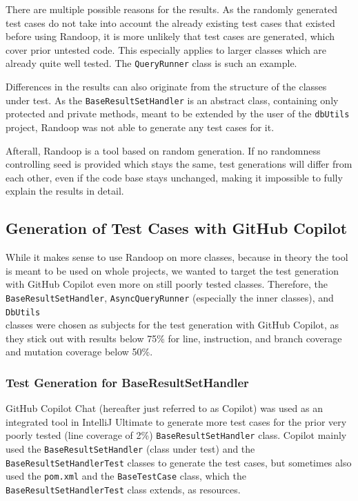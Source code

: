 \documentclass[sigconf]{acmart}
\begin{document}
There are multiple possible reasons for the results. As the randomly generated test cases do not take into account the already existing test cases that existed before using Randoop, it is more unlikely that test cases are generated, which cover prior untested code. This especially applies to larger classes which are already quite well tested. The \texttt{QueryRunner} class is such an example.

Differences in the results can also originate from the structure of the classes under test. As the \texttt{BaseResultSetHandler} is an abstract class, containing only protected and private methods, meant to be extended by the user of the \texttt{dbUtils} project, Randoop was not able to generate any test cases for it.

Afterall, Randoop is a tool based on random generation. If no randomness controlling seed is provided which stays the same, test generations will differ from each other, even if the code base stays unchanged, making it impossible to fully explain the results in detail.

\subsection*{Generation of Test Cases with GitHub Copilot}

While it makes sense to use Randoop on more classes, because in theory the tool is meant to be used on whole projects, we wanted to target the test generation with GitHub Copilot even more on still poorly tested classes. Therefore, the \texttt{BaseResultSetHandler}, \texttt{AsyncQueryRunner} (especially the inner classes), and \texttt{DbUtils} \\
classes were chosen as subjects for the test generation with GitHub Copilot, as they stick out with results below 75\% for line, instruction, and branch coverage and mutation coverage below 50\%.

\subsubsection*{\textbf{Test Generation for BaseResultSetHandler}}

GitHub Copilot Chat (hereafter just referred to as Copilot) was used as an integrated tool in IntelliJ Ultimate to generate more test cases for the prior very poorly tested (line coverage of 2\%) \texttt{BaseResultSetHandler} class. Copilot mainly used the \texttt{BaseResultSetHandler} (class under test) and the \texttt{BaseResultSetHandlerTest} classes to generate the test cases, but sometimes also used the \texttt{pom.xml} and the \texttt{BaseTestCase} class, which the \texttt{BaseResultSetHandlerTest} class extends, as resources.
\end{document}
